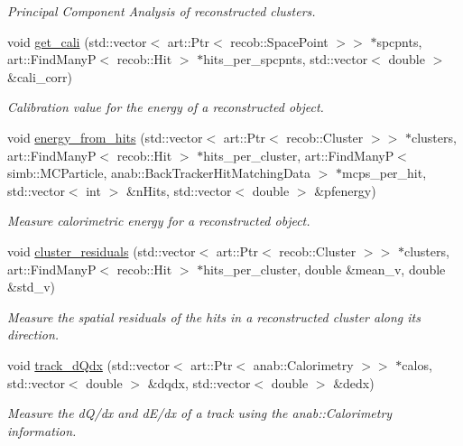 \begin{DoxyCompactItemize}
\begin{DoxyCompactList}\small\item\em Principal Component Analysis of reconstructed clusters. \end{DoxyCompactList}\item 
void \hyperlink{group__lee_gaf141846d9be1716bcfcf351633bdf8e7}{get\-\_\-cali} (std\-::vector$<$ art\-::\-Ptr$<$ recob\-::\-Space\-Point $>$$>$ $\ast$spcpnts, art\-::\-Find\-Many\-P$<$ recob\-::\-Hit $>$ $\ast$hits\-\_\-per\-\_\-spcpnts, std\-::vector$<$ double $>$ \&cali\-\_\-corr)
\begin{DoxyCompactList}\small\item\em Calibration value for the energy of a reconstructed object. \end{DoxyCompactList}\item 
void \hyperlink{group__lee_ga974439f9a96ce4a0e022e5e2e7d5e633}{energy\-\_\-from\-\_\-hits} (std\-::vector$<$ art\-::\-Ptr$<$ recob\-::\-Cluster $>$$>$ $\ast$clusters, art\-::\-Find\-Many\-P$<$ recob\-::\-Hit $>$ $\ast$hits\-\_\-per\-\_\-cluster, art\-::\-Find\-Many\-P$<$ simb\-::\-M\-C\-Particle, anab\-::\-Back\-Tracker\-Hit\-Matching\-Data $>$ $\ast$mcps\-\_\-per\-\_\-hit, std\-::vector$<$ int $>$ \&n\-Hits, std\-::vector$<$ double $>$ \&pfenergy)
\begin{DoxyCompactList}\small\item\em Measure calorimetric energy for a reconstructed object. \end{DoxyCompactList}\item 
void \hyperlink{group__lee_ga01205d4a5d2f8d5ad0d4d5462e0b7563}{cluster\-\_\-residuals} (std\-::vector$<$ art\-::\-Ptr$<$ recob\-::\-Cluster $>$$>$ $\ast$clusters, art\-::\-Find\-Many\-P$<$ recob\-::\-Hit $>$ $\ast$hits\-\_\-per\-\_\-cluster, double \&mean\-\_\-v, double \&std\-\_\-v)
\begin{DoxyCompactList}\small\item\em Measure the spatial residuals of the hits in a reconstructed cluster along its direction. \end{DoxyCompactList}\item 
void \hyperlink{group__lee_ga27cd9ba04f447b9922c56bbb320bce08}{track\-\_\-d\-Qdx} (std\-::vector$<$ art\-::\-Ptr$<$ anab\-::\-Calorimetry $>$$>$ $\ast$calos, std\-::vector$<$ double $>$ \&dqdx, std\-::vector$<$ double $>$ \&dedx)
\begin{DoxyCompactList}\small\item\em Measure the d\-Q/dx and d\-E/dx of a track using the anab\-::\-Calorimetry information. \end{DoxyCompactList}\item 

\end{DoxyCompactItemize}
